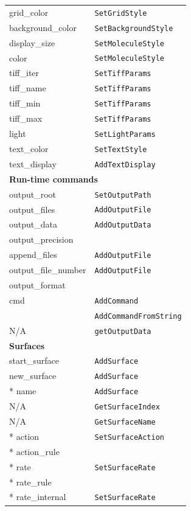 \documentclass {scrbook}
\newcommand {\ttt} {\texttt}
\begin{document}
\begin{longtable}[c]{ll}
grid\_color & \ttt{SetGridStyle}\\
background\_color & \ttt{SetBackgroundStyle}\\
display\_size & \ttt{SetMoleculeStyle}\\
color & \ttt{SetMoleculeStyle}\\
tiff\_iter & \ttt{SetTiffParams}\\
tiff\_name & \ttt{SetTiffParams}\\
tiff\_min & \ttt{SetTiffParams}\\
tiff\_max & \ttt{SetTiffParams}\\
light & \ttt{SetLightParams}\\
text\_color & \ttt{SetTextStyle}\\
text\_display & \ttt{AddTextDisplay}\\
\hline
\multicolumn{2}{l}{\hspace{0.3in}\textbf{Run-time commands}}\\
\hline
output\_root & \ttt{SetOutputPath}\\
output\_files & \ttt{AddOutputFile}\\
output\_data & \ttt{AddOutputData} \\ %
output\_precision \\ %
append\_files & \ttt{AddOutputFile}\\
output\_file\_number & \ttt{AddOutputFile}\\
output\_format \\ %
cmd & \ttt{AddCommand}\\
& \ttt{AddCommandFromString}\\
N/A & \ttt{getOutputData}\\
\hline
\multicolumn{2}{l}{\hspace{0.3in}\textbf{Surfaces}}\\
\hline
start\_surface & \ttt{AddSurface}\\
new\_surface & \ttt{AddSurface}\\
{*} name & \ttt{AddSurface}\\
N/A & \ttt{GetSurfaceIndex}\\
N/A & \ttt{GetSurfaceName}\\
{*} action & \ttt{SetSurfaceAction}\\
{*} action\_rule \\ %
{*} rate & \ttt{SetSurfaceRate}\\
{*} rate\_rule \\ %
{*} rate\_internal & \ttt{SetSurfaceRate}\\

\end{longtable}
\end{document}
